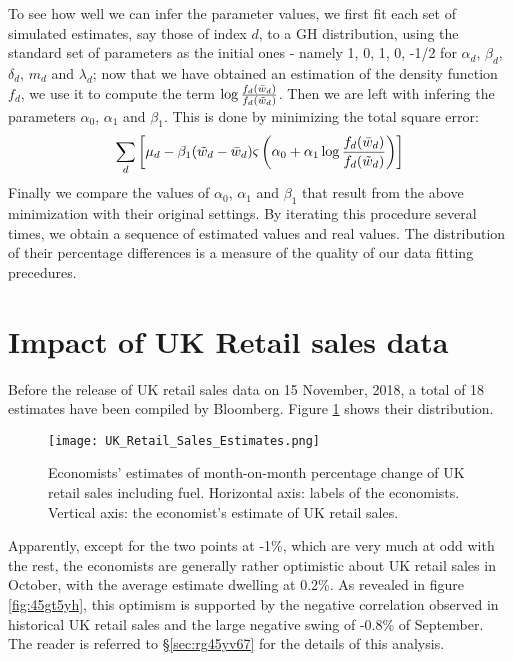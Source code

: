 \documentclass[a4paper,11pt,pdftex,twoside,titlepage]{article}
\begin{document}
To see how well we can infer the parameter values, we first fit each
set of simulated estimates, say those of index $d$, to a GH
distribution, using the standard set of parameters as the initial ones
- namely 1, 0, 1, 0, -1/2 for $\alpha_d$, $\beta_d$, $\delta_d$, $m_d$ and
$\lambda_d$; now that we have obtained an estimation of the density
function $f_d$, we use it to compute the term
$\log{f_d(\bar w_d) \over f_d(\tilde w_d)}$. Then we are left with
infering the parameters $\alpha_0$, $\alpha_1$ and
$\beta_1$. This is done by minimizing the total square error:
\[
  \sum_d \left[
    \mu_d - \beta_1  (\tilde w_d - \bar w_d)
    \varsigma\left(
      \alpha_0 + \alpha_1 \log{f_d(\bar w_d) \over f_d(\tilde w_d)}
    \right)
  \right]
\]
Finally we compare the values of $\alpha_0$, $\alpha_1$ and
$\beta_1$ that result from the above minimization with their original
settings. By iterating this procedure several times, we obtain
a sequence of estimated values and real values. The distribution of
their percentage differences is a measure of the quality of our data
fitting precedures.

\section{Impact of UK Retail sales data}
\label{sec:retail_sales}
Before the release of UK retail sales data on 15 November, 2018, a
total of 18 estimates have been compiled by Bloomberg. Figure
\ref{fig:56ub7uj} shows their distribution.
\begin{figure}[htb!]
  \centering
  \texttt{[image: UK\_Retail\_Sales\_Estimates.png]}
  \caption{Economists' estimates of month-on-month percentage change
    of UK retail sales including fuel. Horizontal axis: labels of the
    economists. Vertical axis: the economist's estimate of UK retail sales.}
  \label{fig:56ub7uj}
\end{figure}
Apparently, except for the two points at -1\%, which are very much
at odd with the rest, the economists are generally rather optimistic
about UK retail sales in October, with the average estimate dwelling
at 0.2\%. As revealed in figure \ref{fig:45gt5yh}, this optimism is
supported by the negative correlation observed in historical UK retail
sales and the large negative swing of -0.8\% of September. The reader
is referred to \S\ref{sec:rg45yv67} for the details of this analysis.
\end{document}
